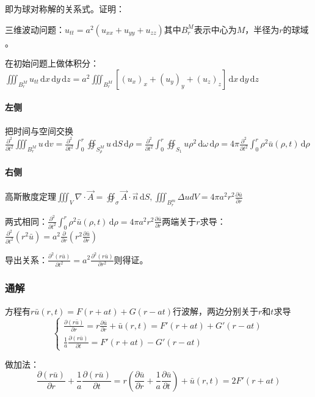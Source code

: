 即为球对称解的关系式。证明：

三维波动问题：\(u_{tt}=a^2(u_{xx}+u_{yy}+u_{zz})\)其中\(B_r^M\)表示中心为\(M\)，半径为\(r\)的球域	。

在初始问题上做体积分：\(\iiint_{B_r^M}{u_{tt}\,\mathrm{d}x\,\mathrm{d}y\,\mathrm{d}z}=a^2\iiint_{B_r^M}[(u_x)_x+(u_y)_y+(u_z)_z]\,\mathrm{d}x\,\mathrm{d}y\,\mathrm{d}z\)

\paragraph{左侧}把时间与空间交换\(\frac{\partial^2}{\partial t^2}\iiint_{B_r^M}u\,\mathrm{d}v=\frac{\partial^2}{\partial t^2}\int_0^r\oiint_{S_\rho^M}u\,\mathrm{d}S\,\mathrm{d}\rho=\frac{\partial^2}{\partial t^2}\int_0^r\oiint_{S_1}u\rho^2\,\mathrm{d}\omega\,\mathrm{d}\rho=4\pi\frac{\partial^2}{\partial t^2}\int_0^r\rho^2\bar{u}(\rho,t)\,\mathrm{d}\rho\)

\paragraph{右侧}高斯散度定理\(\iiint_{V}{\nabla\cdot\vec{A}}=\oiint_{\sigma}{\vec{A}\cdot\vec{n}\,\mathrm{d}S},\iiint_{B_r^m}\Delta u d V=4\pi a^2r^2\frac{\partial\bar{u}}{\partial r}\)

两式相同：\(\frac{\partial^2}{\partial t^2}\int_{0}^{r}{\rho^2\bar{u}\left(\rho,t\right)\,\mathrm{d}\rho}=4\pi a^2r^2\frac{\partial\bar{u}}{\partial r}\)两端关于\(r\)求导：\(\frac{\partial^2}{\partial t^2}(r^2\bar{u})=a^2\frac{\partial}{\partial r}\left(r^2\frac{\partial\bar{u}}{\partial r}\right)\)

导出关系：\(\frac{\partial^2(r\bar{u})}{\partial t^2}=a^2\frac{\partial^2(r\bar{u})}{\partial r^2}\)则得证。

\subsubsection{通解}

方程有\(r\bar{u}(r,t)=F(r+at)+G(r-at)\)行波解，两边分别关于\(r\)和\(t\)求导
\[\begin{cases}\frac{\partial(r\bar{u})}{\partial r}=r\frac{\partial\bar{u}}{\partial r}+\bar{u}(r,t)=F'(r+at)+G'(r-at)\\\frac{1}{a}\frac{\partial(r\bar{u})}{\partial t}=F'(r+at)-G'(r-at)\end{cases}\]

做加法：
\[
\frac{\partial(r\bar{u})}{\partial r}+\frac{1}{a}\frac{\partial(r\bar{u})}{\partial t}=r\left(\frac{\partial\bar{u}}{\partial r}+\frac{1}{a}\frac{\partial\bar{u}}{\partial t}\right)+\bar{u}(r,t)=2F'(r+at)
\]

